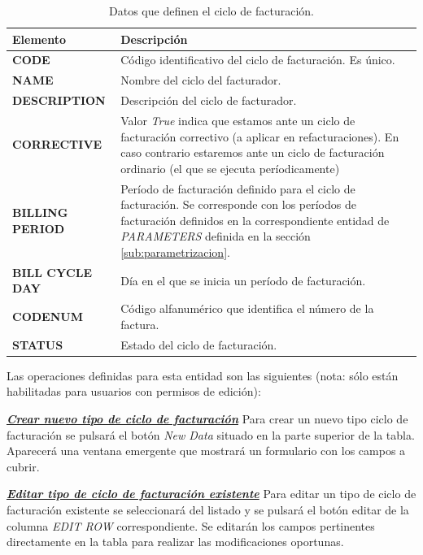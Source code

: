 \begin{table}[H]
  \centering
  \setlength{\leftmargini}{0.4cm}
  \resizebox{14cm}{!} {
  \begin{tabular}{|m{3cm} m{11cm}|}
  \rowcolor{udcpink!25}
  \hline
  	\textbf{Elemento} & \textbf{Descripción} \\\hline
	\textbf{CODE} & Código identificativo del ciclo de facturación. Es único.   \\
	\textbf{NAME} & Nombre del ciclo del facturador. \\
	\textbf{DESCRIPTION} & Descripción del ciclo de facturador. \\
	\textbf{CORRECTIVE} & Valor \emph{True} indica que estamos ante un ciclo de facturación correctivo (a aplicar en refacturaciones). En caso contrario estaremos ante un ciclo de facturación ordinario (el que se ejecuta períodicamente)\\
	\textbf{BILLING PERIOD} & Período de facturación definido para el ciclo de facturación. Se corresponde con los períodos de facturación definidos en la correspondiente entidad de \emph{PARAMETERS} definida en la sección \ref{sub:parametrizacion}.   \\
	\textbf{BILL CYCLE DAY} & Día en el que se inicia un período de facturación. \\
	\textbf{CODENUM} & Código alfanumérico que identifica el número de la factura.\\
	\textbf{STATUS} & Estado del ciclo de facturación.
	\\\hline
  \end{tabular}
  } %
  \caption{Datos que definen el ciclo de facturación.}
  \label{tab:ciclo-facturacion}
\end{table}


Las operaciones definidas para esta entidad son las siguientes (nota: sólo están habilitadas para usuarios con permisos de edición):

\underline{\textsl{\textbf{Crear nuevo tipo de ciclo de facturación}}}\newline
Para crear un nuevo tipo ciclo de facturación se pulsará el botón \textit{New Data} situado en la parte superior de la tabla. Aparecerá una ventana emergente que mostrará un formulario con los campos a cubrir.


\underline{\textsl{\textbf{Editar tipo de ciclo de facturación existente}}}\newline
Para editar un tipo de ciclo de facturación existente se seleccionará del listado y se pulsará el botón editar de la columna \textit{EDIT ROW} correspondiente. Se editarán los campos pertinentes directamente en la tabla para realizar las modificaciones oportunas. 

